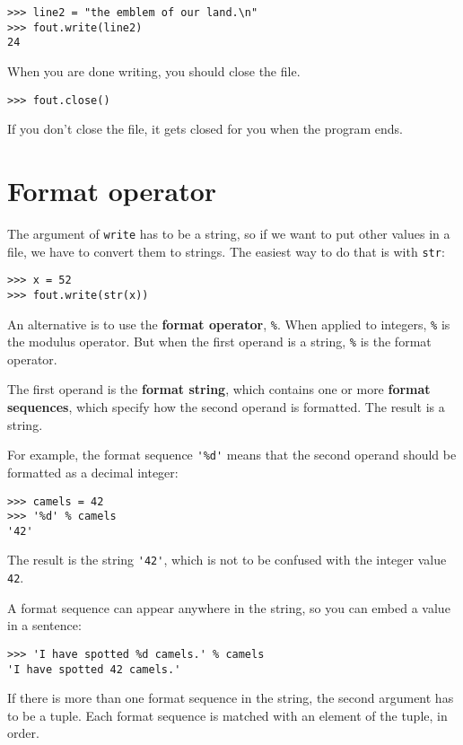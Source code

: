 \documentclass[10pt]{book}
\begin{document}
\begin{verbatim}
>>> line2 = "the emblem of our land.\n"
>>> fout.write(line2)
24
\end{verbatim}
%
When you are done writing, you should close the file.

\begin{verbatim}
>>> fout.close()
\end{verbatim}
%
%
If you don't close the file, it gets closed for you when the
program ends.


\section{Format operator}

The argument of {\tt write} has to be a string, so if we want
to put other values in a file, we have to convert them to
strings.  The easiest way to do that is with {\tt str}:

\begin{verbatim}
>>> x = 52
>>> fout.write(str(x))
\end{verbatim}
%
An alternative is to use the {\bf format operator}, {\tt \%}.  When
applied to integers, {\tt \%} is the modulus operator.  But
when the first operand is a string, {\tt \%} is the format operator.

The first operand is the {\bf format string}, which contains
one or more {\bf format sequences}, which
specify how
the second operand is formatted.  The result is a string.

For example, the format sequence \verb"'%d'" means that
the second operand should be formatted as a decimal
integer:

\begin{verbatim}
>>> camels = 42
>>> '%d' % camels
'42'
\end{verbatim}
%
The result is the string \verb"'42'", which is not to be confused
with the integer value {\tt 42}.

A format sequence can appear anywhere in the string,
so you can embed a value in a sentence:

\begin{verbatim}
>>> 'I have spotted %d camels.' % camels
'I have spotted 42 camels.'
\end{verbatim}
%
If there is more than one format sequence in the string,
the second argument has to be a tuple.  Each format sequence is
matched with an element of the tuple, in order.
\end{document}
